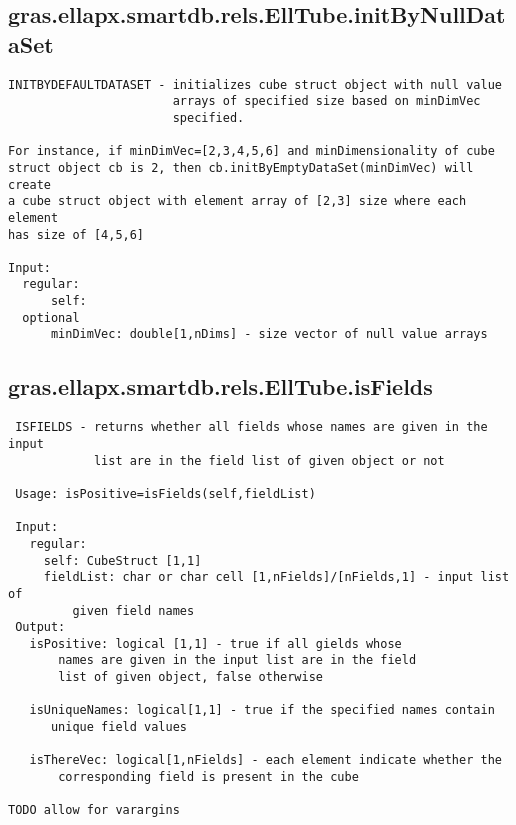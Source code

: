 \subsection{\texorpdfstring{gras.ellapx.smartdb.rels.EllTube.initByNullDataSet}{initByNullDataSet}}\label{method:gras.ellapx.smartdb.rels.EllTube.initByNullDataSet}
\begin{verbatim}
INITBYDEFAULTDATASET - initializes cube struct object with null value
                       arrays of specified size based on minDimVec
                       specified.

For instance, if minDimVec=[2,3,4,5,6] and minDimensionality of cube
struct object cb is 2, then cb.initByEmptyDataSet(minDimVec) will create
a cube struct object with element array of [2,3] size where each element
has size of [4,5,6]

Input:
  regular:
      self:
  optional
      minDimVec: double[1,nDims] - size vector of null value arrays
\end{verbatim}
\subsection{\texorpdfstring{gras.ellapx.smartdb.rels.EllTube.isFields}{isFields}}\label{method:gras.ellapx.smartdb.rels.EllTube.isFields}
\begin{verbatim}
 ISFIELDS - returns whether all fields whose names are given in the input
            list are in the field list of given object or not

 Usage: isPositive=isFields(self,fieldList)

 Input:
   regular:
     self: CubeStruct [1,1]
     fieldList: char or char cell [1,nFields]/[nFields,1] - input list of
         given field names
 Output:
   isPositive: logical [1,1] - true if all gields whose
       names are given in the input list are in the field
       list of given object, false otherwise

   isUniqueNames: logical[1,1] - true if the specified names contain
      unique field values

   isThereVec: logical[1,nFields] - each element indicate whether the
       corresponding field is present in the cube

TODO allow for varargins
\end{verbatim}
